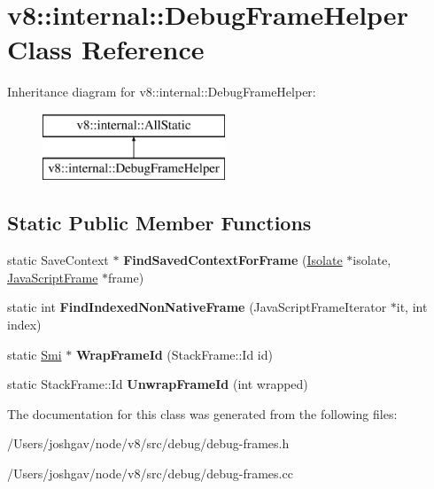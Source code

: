 \hypertarget{classv8_1_1internal_1_1_debug_frame_helper}{}\section{v8\+:\+:internal\+:\+:Debug\+Frame\+Helper Class Reference}
\label{classv8_1_1internal_1_1_debug_frame_helper}
Inheritance diagram for v8\+:\+:internal\+:\+:Debug\+Frame\+Helper\+:\begin{figure}[H]
\begin{center}
\leavevmode
\includegraphics[height=2.000000cm]{classv8_1_1internal_1_1_debug_frame_helper}
\end{center}
\end{figure}
\subsection*{Static Public Member Functions}
\begin{DoxyCompactItemize}
\item 
static Save\+Context $\ast$ {\bfseries Find\+Saved\+Context\+For\+Frame} (\hyperlink{classv8_1_1internal_1_1_isolate}{Isolate} $\ast$isolate, \hyperlink{classv8_1_1internal_1_1_java_script_frame}{Java\+Script\+Frame} $\ast$frame)\hypertarget{classv8_1_1internal_1_1_debug_frame_helper_adae32f68eee29c54f5a63d529847acb7}{}\label{classv8_1_1internal_1_1_debug_frame_helper_adae32f68eee29c54f5a63d529847acb7}

\item 
static int {\bfseries Find\+Indexed\+Non\+Native\+Frame} (Java\+Script\+Frame\+Iterator $\ast$it, int index)\hypertarget{classv8_1_1internal_1_1_debug_frame_helper_a8b71b46f814a5eb9387c3f083c0e39bf}{}\label{classv8_1_1internal_1_1_debug_frame_helper_a8b71b46f814a5eb9387c3f083c0e39bf}

\item 
static \hyperlink{classv8_1_1internal_1_1_smi}{Smi} $\ast$ {\bfseries Wrap\+Frame\+Id} (Stack\+Frame\+::\+Id id)\hypertarget{classv8_1_1internal_1_1_debug_frame_helper_ae9df2704a1ad17826ee3460c1b432e97}{}\label{classv8_1_1internal_1_1_debug_frame_helper_ae9df2704a1ad17826ee3460c1b432e97}

\item 
static Stack\+Frame\+::\+Id {\bfseries Unwrap\+Frame\+Id} (int wrapped)\hypertarget{classv8_1_1internal_1_1_debug_frame_helper_a86a77734e346a4be7349f1cb0d74a888}{}\label{classv8_1_1internal_1_1_debug_frame_helper_a86a77734e346a4be7349f1cb0d74a888}

\end{DoxyCompactItemize}


The documentation for this class was generated from the following files\+:\begin{DoxyCompactItemize}
\item 
/\+Users/joshgav/node/v8/src/debug/debug-\/frames.\+h\item 
/\+Users/joshgav/node/v8/src/debug/debug-\/frames.\+cc\end{DoxyCompactItemize}
